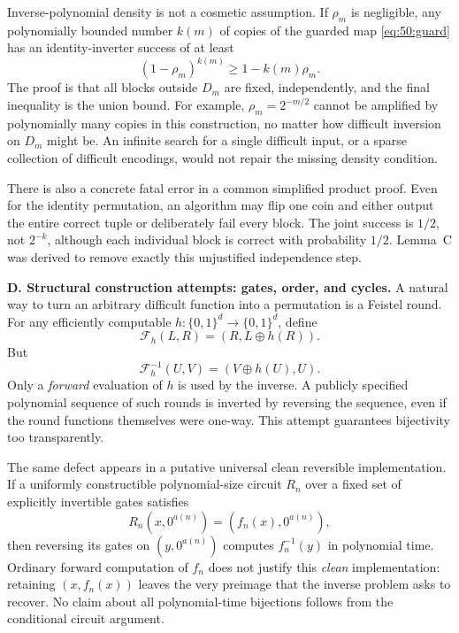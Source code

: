\documentclass[11pt,a4paper]{article}
\numberwithin{equation}{section}
\begin{document}
Inverse-polynomial density is not a cosmetic assumption. If $\rho_m$
is negligible, any polynomially bounded number $k(m)$ of copies of the
guarded map \eqref{eq:50:guard} has an identity-inverter success of at
least
\begin{equation}\label{eq:50:sparse}
 (1-\rho_m)^{k(m)}\ge1-k(m)\rho_m.
\end{equation}
The proof is that all blocks outside $D_m$ are fixed, independently,
and the final inequality is the union bound. For example,
$\rho_m=2^{-m/2}$ cannot be amplified by polynomially many copies in
this construction, no matter how difficult inversion on $D_m$ might be.
An infinite search for a single difficult input, or a sparse collection
of difficult encodings, would not repair the missing density condition.

There is also a concrete fatal error in a common simplified product
proof. Even for the identity permutation, an algorithm may flip one
coin and either output the entire correct tuple or deliberately fail
every block. The joint success is $1/2$, not $2^{-k}$, although each
individual block is correct with probability $1/2$. Lemma~C was derived
to remove exactly this unjustified independence step.

\medskip{}
\textbf{D. Structural construction attempts: gates, order, and cycles.}
A natural way to turn an arbitrary difficult function into a permutation
is a Feistel round. For any efficiently computable
$h:\{0,1\}^d\to\{0,1\}^d$, define
\[
 \mathcal F_h(L,R)=(R,L\mathbin\oplus h(R)).
\]
But
\begin{equation}\label{eq:50:feistel}
 \mathcal F_h^{-1}(U,V)=(V\mathbin\oplus h(U),U).
\end{equation}
Only a \emph{forward} evaluation of $h$ is used by the inverse. A
publicly specified polynomial sequence of such rounds is inverted by
reversing the sequence, even if the round functions themselves were
one-way. This attempt guarantees bijectivity too transparently.

The same defect appears in a putative universal clean reversible
implementation. If a uniformly constructible polynomial-size circuit
$R_n$ over a fixed set of explicitly invertible gates satisfies
\[
 R_n(x,0^{a(n)})=(f_n(x),0^{a(n)}),
\]
then reversing its gates on $(y,0^{a(n)})$ computes $f_n^{-1}(y)$ in
polynomial time. Ordinary forward computation of $f_n$ does not justify
this \emph{clean} implementation: retaining $(x,f_n(x))$ leaves the very
preimage that the inverse problem asks to recover. No claim about all
polynomial-time bijections follows from the conditional circuit argument.
\end{document}
